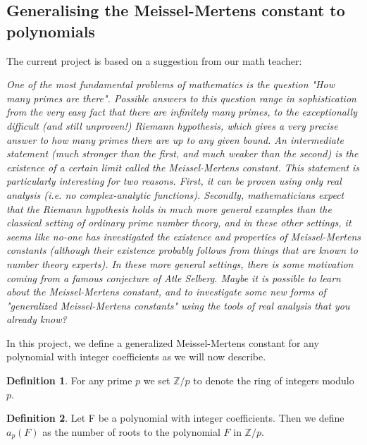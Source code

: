 \documentclass{article}
\theoremstyle{definition}
\newtheorem{definition}{Definition}[section]
\theoremstyle{remark}
\begin{document}
\subsection{Generalising the Meissel-Mertens constant to polynomials}

The current project is based on a suggestion from our math teacher:
\vskip12pt
\begin{addmargin}{1cm}
\it One of the most fundamental problems of mathematics is the question "How many primes are there". Possible answers to this question range in sophistication from the very easy fact that there are infinitely many primes, to the exceptionally difficult (and still unproven!) Riemann hypothesis, which gives a very precise answer to how many primes there are up to any given bound. An intermediate statement (much stronger than the first, and much weaker than the second) is the existence of a certain limit called the Meissel-Mertens constant. This statement is particularly interesting for two reasons. First, it can be proven using only real analysis (i.e. no complex-analytic functions). Secondly, mathematicians expect that the Riemann hypothesis holds in much more general examples than the classical setting of ordinary prime number theory, and in these other settings, it seems like no-one has investigated the existence and properties of Meissel-Mertens constants (although their existence probably follows from things that are known to number theory experts). In these more general settings, there is some motivation coming from a famous conjecture of Atle Selberg. Maybe it is possible to learn about the Meissel-Mertens constant, and to investigate some new forms of "generalized Meissel-Mertens constants" using the tools of real analysis that you already know? %
\end{addmargin}
\vskip12pt

In this project, we define a generalized Meissel-Mertens constant for any polynomial with integer coefficients as we will now describe.
\begin{definition}
For any prime $p$ we set $\mathbb{Z}/p$ to denote the ring of integers modulo $p$.
\end{definition}

\begin{definition}\label{defF}
Let F be a polynomial with integer coefficients. Then we define
$a_p(F)$ as the number of roots to the polynomial $F$ in $\mathbb{Z}/p$.
\end{definition}
\end{document}
